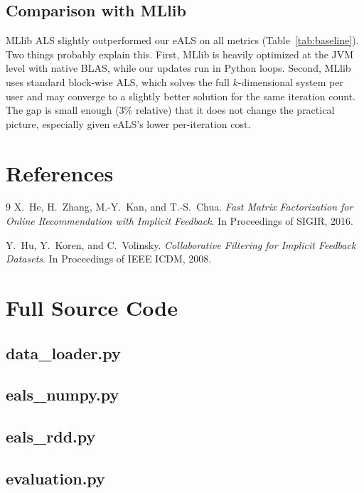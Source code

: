 \documentclass[11pt,a4paper]{article}
\begin{document}
\subsection{Comparison with MLlib}

MLlib ALS slightly outperformed our eALS on all metrics (Table~\ref{tab:baseline}). Two things probably explain this. First, MLlib is heavily optimized at the JVM level with native BLAS, while our updates run in Python loops. Second, MLlib uses standard block-wise ALS, which solves the full $k$-dimensional system per user and may converge to a slightly better solution for the same iteration count. The gap is small enough (3\% relative) that it does not change the practical picture, especially given eALS's lower per-iteration cost.


\section*{References}

\begin{thebibliography}{9}
X.~He, H.~Zhang, M.-Y.~Kan, and T.-S.~Chua.
\textit{Fast Matrix Factorization for Online Recommendation with Implicit Feedback}.
In Proceedings of SIGIR, 2016.

Y.~Hu, Y.~Koren, and C.~Volinsky.
\textit{Collaborative Filtering for Implicit Feedback Datasets}.
In Proceedings of IEEE ICDM, 2008.
\end{thebibliography}


\appendix
\section{Full Source Code}
\label{sec:code}

\subsection{data\_loader.py}


\subsection{eals\_numpy.py}


\subsection{eals\_rdd.py}


\subsection{evaluation.py}

\end{document}
